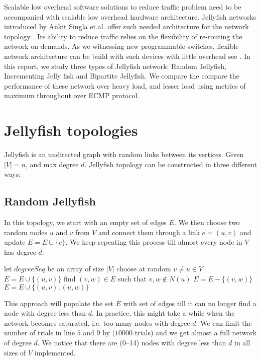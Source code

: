 \documentclass[conference]{IEEEtran}
\begin{document}
Scalable low overhead software solutions to reduce traffic problem need to be accompanied with scalable low overhead hardware architecture. Jellyfish networks introduced by Ankit Singla et.al. offer such needed architecture for the network topology \cite{Singla:12}. Its ability to reduce traffic relies on the flexibility of re-routing the network on demands. As we witnessing new programmable switches, flexible network architecture can be build with such devices with little overhead see \cite{ben2018}. In this report, we study three types of Jellyfish network: Random Jellyfish, Incrementing Jelly fish and Bipartite Jellyfish. We compare the compare the performance of these network over heavy load, and lesser load using metrics of maximum throughout over ECMP protocol.

\section{Jellyfish topologies}

Jellyfish is an undirected graph with random links between its vertices. Given $|V| = n$, and max degree $d$. Jellyfish topology can be constructed in three different ways:

\subsection{Random Jellyfish} 
In this topology, we start with an empty set of edges $E$. We then choose two random nodes $u$ and $v$ from $V$ and connect them through a link $e = (u,v)$ and update $E = E \cup\{e\}$. We keep repeating this process till almost every node in $V$ has degree $d$. 

\begin{algorithm}[H]
\caption{}
  \begin{algorithmic}[1]
    \State let $degreeSeq$ be an array of size $|V|$
    \State choose at random $ v \neq u \in V$
      \State $E = E \cup \{ (u,v) \}$
      \Else
      \State find $ (v,w) \in E$ such that $v, w \notin N(u)$
      \State $E = E - \{(v,w)\}$
      \State $E = E \cup \{ (u,v), (u,w) \}$
      \EndIf
    \EndIf
    \EndWhile
  \EndFunction
  \end{algorithmic}
\end{algorithm} 
This approach will populate the set $E$ with set of edges till it can no longer find a node with degree less than $d$. In practice, this might take a while when the network becomes saturated, i.e. too many nodes with degree $d$. We can limit the number of trials in line $5$ and $9$ by ($10000$ trials) and we get almost a full network of degree $d$. We notice that there are (0--14) nodes with degree less than $d$ in all sizes of $V$ implemented.
\end{document}
